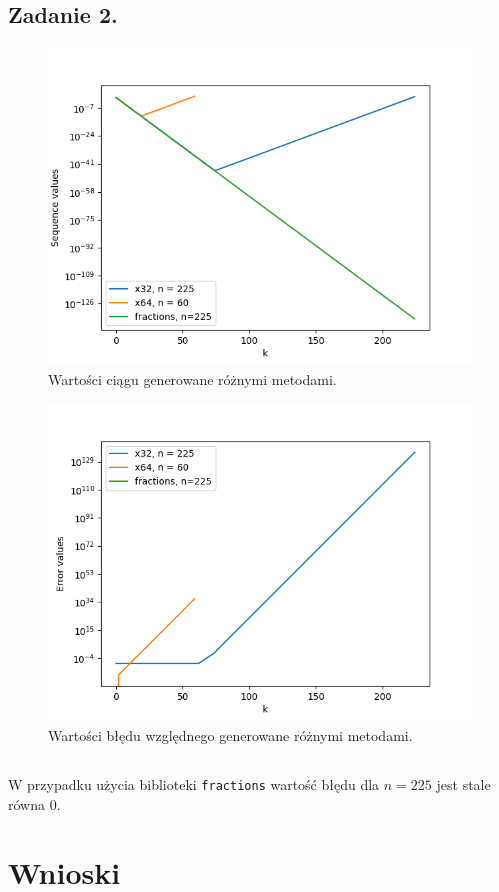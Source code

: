 \documentclass[11pt]{scrartcl}
\begin{document}
    \subsection{Zadanie 2.}
    \begin{figure}[H]
        \centering
        \includegraphics[width=0.8\linewidth]{seq.png}
        \caption{Wartości ciągu generowane różnymi metodami.}
    \end{figure}
    \begin{figure}[H]
        \centering
        \includegraphics[width=0.8\linewidth]{seq_error.png}
        \caption{Wartości błędu względnego generowane różnymi metodami.}
    \end{figure}
    \subsection*{}
    W przypadku użycia biblioteki \texttt{fractions} wartość błędu dla $n=225$
    jest stale równa $0$.
    
    \section{Wnioski}
\end{document}
